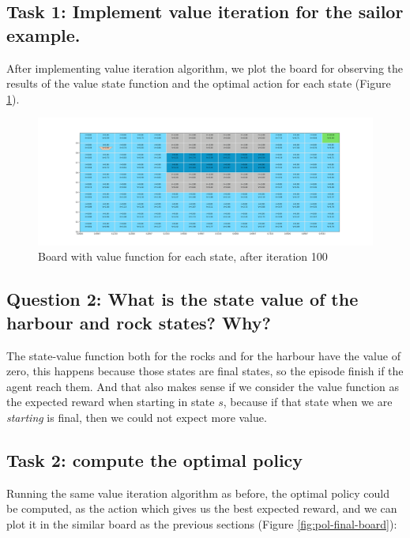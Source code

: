 \documentclass[12pt]{article}
\begin{document}
\subsection{Task 1: Implement value iteration for the sailor example.}

After implementing value iteration algorithm, we plot the board for observing the results of the value state function and the optimal action for each state (Figure \ref{fig:final-board}).

\begin{figure}[h]
    \centering
    \includegraphics[scale=0.25]{exercise-2/report/img/final-board.png}
    \caption{Board with value function for each state, after iteration 100}
    \label{fig:final-board}
\end{figure}

\subsection{Question 2: What is the state value of the harbour and rock states? Why?}

The state-value function both for the rocks and for the harbour have the value of zero, this happens because those states are final states, so the episode finish if the agent reach them. And that also makes sense if we consider the value function as the expected reward when starting in state $s$, because if that state when we are \textit{starting} is final, then we could not expect more value.

\subsection{Task 2: compute the optimal policy}

Running the same value iteration algorithm as before, the optimal policy could be computed, as the action which gives us the best expected reward, and we can plot it in the similar board as the previous sections (Figure \ref{fig:pol-final-board}):
\end{document}
